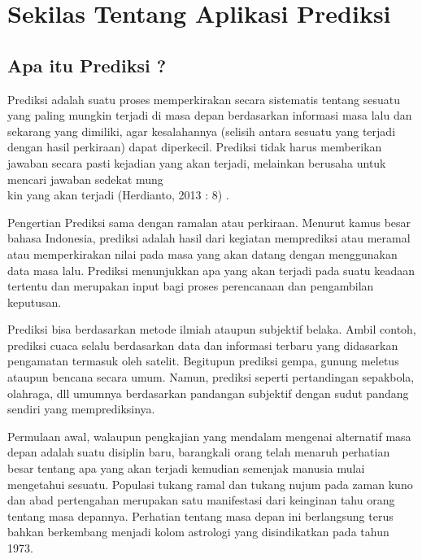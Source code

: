 \chapter{Sekilas Tentang Aplikasi Prediksi}

\section{Apa itu Prediksi ?}
\par Prediksi adalah suatu proses memperkirakan secara sistematis tentang sesuatu yang paling mungkin terjadi di masa depan berdasarkan informasi masa lalu dan sekarang yang dimiliki, agar kesalahannya (selisih antara sesuatu yang terjadi dengan hasil perkiraan) dapat diperkecil. Prediksi tidak harus memberikan jawaban secara pasti kejadian yang akan terjadi, melainkan berusaha untuk mencari jawaban sedekat mung\\ kin yang akan terjadi (Herdianto, 2013 : 8) .\\

\par Pengertian Prediksi sama dengan ramalan atau perkiraan. Menurut kamus besar bahasa Indonesia, prediksi adalah hasil dari kegiatan memprediksi atau meramal atau memperkirakan nilai pada masa yang akan datang dengan menggunakan data masa lalu. Prediksi menunjukkan apa yang akan terjadi pada suatu keadaan tertentu dan merupakan input bagi proses perencanaan dan pengambilan keputusan.\\

\par Prediksi bisa berdasarkan metode ilmiah ataupun subjektif belaka. Ambil contoh, prediksi cuaca selalu berdasarkan data dan informasi terbaru yang didasarkan pengamatan termasuk oleh satelit. Begitupun prediksi gempa, gunung meletus ataupun bencana secara umum. Namun, prediksi seperti pertandingan sepakbola, olahraga, dll umumnya berdasarkan pandangan subjektif dengan sudut pandang sendiri yang memprediksinya. \\

\par Permulaan awal, walaupun pengkajian yang mendalam mengenai alternatif masa depan adalah suatu disiplin baru, barangkali orang telah menaruh perhatian besar tentang apa yang akan terjadi kemudian semenjak manusia mulai mengetahui sesuatu. Populasi tukang ramal dan tukang nujum pada zaman kuno dan abad pertengahan merupakan satu manifestasi dari keinginan tahu orang tentang masa depannya. Perhatian tentang masa depan ini berlangsung terus bahkan berkembang menjadi kolom astrologi yang disindikatkan pada tahun 1973. \\

